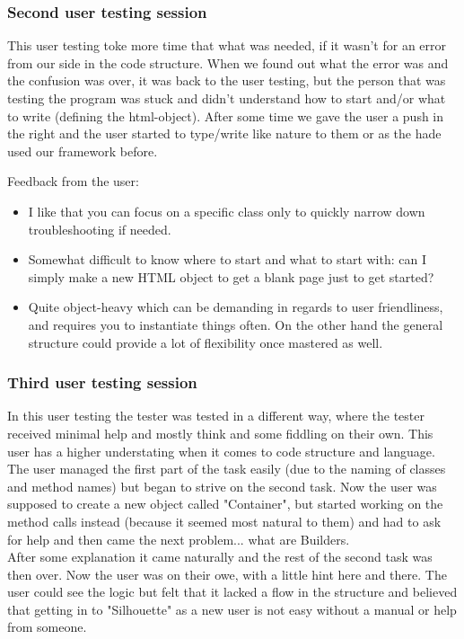 \documentclass[12pt]{article}
\begin{document}
        \subsubsection{Second user testing session}
        This user testing toke more time that what was needed, if it wasn’t for an error from our side in the code structure. When we found out what the error was and the confusion was over, it was back to the user testing, but the person that was testing the program was stuck and didn’t understand how to start and/or what to write (defining the html-object). After some time we gave the user a push in the right and the user started to type/write like nature to them or as the hade used our framework before.

        Feedback from the user:
        \begin{itemize}
            \item I like that you can focus on a specific class only to quickly narrow down troubleshooting if needed.
            \item Somewhat difficult to know where to start and what to start with: can I simply make a new HTML object to get a blank page just to get started?
            \item Quite object-heavy which can be demanding in regards to user friendliness, and requires you to instantiate things often. On the other hand the general structure could provide a lot of flexibility once mastered as well.
        \end{itemize}

        \subsubsection{Third user testing session}
        In this user testing the tester was tested in a different way, where the tester received minimal help and mostly think and some fiddling on their own. This user has a higher understating when it comes to code structure and language.\\ The user managed the first part of the task easily (due to the naming of classes and method names) but began to strive on the second task. Now the user was supposed to create a new object called "Container", but started working on the method calls instead (because it seemed most natural to them) and had to ask for help and then came the next problem... what are Builders.\\ After some explanation it came naturally and the rest of the second task was then over. Now the user was on their owe, with a little hint here and there. The user could see the logic but felt that it lacked a flow in the structure and believed that getting in to "Silhouette" as a new user is not easy without a manual or help from someone.
        
\end{document}
